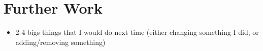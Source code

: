 \section{Further Work}
{\color{red}
	\begin{itemize}
		\item 2-4 bigs things that I would do next time (either changing something I did, or adding/removing something)
	\end{itemize}
}